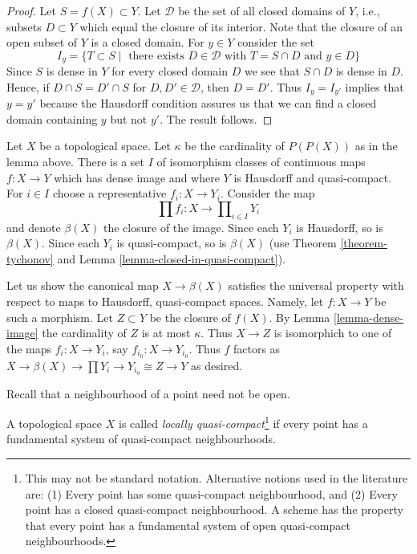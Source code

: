 \begin{proof}
Let $S = f(X) \subset Y$. Let $\mathcal{D}$ be the set of all
closed domains of $Y$, i.e., subsets $D \subset Y$ which
equal the closure of its interior. Note that the closure of an
open subset of $Y$ is a closed domain. For $y \in Y$ consider the set
$$
I_y = \{T \subset S \mid \text{ there exists }
D \in \mathcal{D}\text{ with }T = S \cap D\text{ and }y \in D\}
$$
Since $S$ is dense in $Y$ for every closed domain $D$ we see
that $S \cap D$ is dense in $D$. Hence, if
$D \cap S = D' \cap S$ for $D, D' \in \mathcal{D}$, then
$D = D'$. Thus $I_y = I_{y'}$ implies that $y = y'$ because the
Hausdorff condition assures us that we can find a closed domain
containing $y$ but not $y'$. The result follows.
\end{proof}

\noindent
Let $X$ be a topological space. Let $\kappa$ be the cardinality of
$P(P(X))$ as in the lemma above. There is a set $I$ of isomorphism
classes of continuous maps $f : X \to Y$ which has dense image and
where $Y$ is Hausdorff and quasi-compact. For $i \in I$ choose a
representative $f_i : X \to Y_i$. Consider the map
$$
\prod f_i : X \longrightarrow \prod\nolimits_{i \in I} Y_i
$$
and denote $\beta(X)$ the closure of the image. Since each $Y_i$ is
Hausdorff, so is $\beta(X)$. Since each $Y_i$ is quasi-compact, so
is $\beta(X)$ (use Theorem \ref{theorem-tychonov} and
Lemma \ref{lemma-closed-in-quasi-compact}).

\medskip\noindent
Let us show the canonical map $X \to \beta(X)$ satisfies the universal
property with respect to maps to Hausdorff, quasi-compact spaces. Namely,
let $f : X \to Y$ be such a morphism. Let $Z \subset Y$ be the closure
of $f(X)$. By Lemma \ref{lemma-dense-image} the cardinality of $Z$
is at most $\kappa$. Thus $X \to Z$ is isomorphich to one of the maps
$f_i : X \to Y_i$, say $f_{i_0} : X \to Y_{i_0}$. Thus $f$ factors as
$X \to \beta(X) \to \prod Y_i \to Y_{i_0} \cong Z \to Y$ as desired.

\medskip\noindent
Recall that a neighbourhood of a point need not be open.

\begin{definition}
\label{definition-locally-quasi-compact}
A topological space $X$ is called
{\it locally quasi-compact}\footnote{This may not be standard notation.
Alternative notions used in the literature are: (1) Every point has some
quasi-compact neighbourhood, and (2) Every point has a closed quasi-compact
neighbourhood. A scheme has the property that every point has a fundamental
system of open quasi-compact neighbourhoods.} if every
point has a fundamental system of quasi-compact neighbourhoods.
\end{definition}

